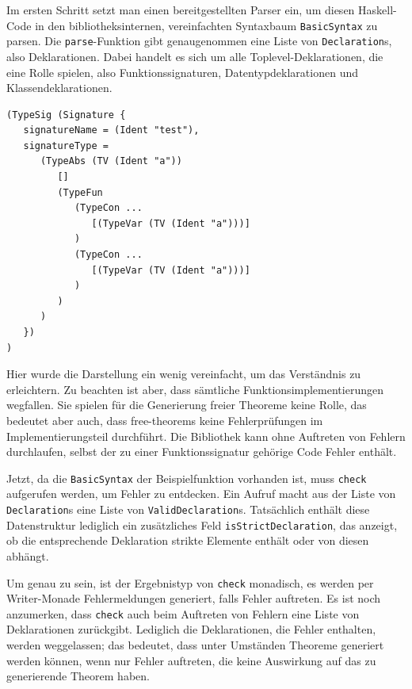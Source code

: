 Im ersten Schritt setzt man einen bereitgestellten Parser ein, um diesen Haskell-Code in den bibliotheksinternen, vereinfachten
Syntaxbaum \texttt{BasicSyntax} zu parsen. Die \texttt{parse}-Funktion gibt genaugenommen eine Liste von \texttt{Declaration}s, also Deklarationen. Dabei handelt es sich um alle Toplevel-Deklarationen, die eine Rolle spielen, also Funktionssignaturen,
Datentypdeklarationen und Klassendeklarationen.


\begin{verbatim}
(TypeSig (Signature {
   signatureName = (Ident "test"),
   signatureType =
      (TypeAbs (TV (Ident "a"))
         []
         (TypeFun
            (TypeCon ...
               [(TypeVar (TV (Ident "a")))]
            )
            (TypeCon ...
               [(TypeVar (TV (Ident "a")))]
            )
         )
      )
   })
)
\end{verbatim}

Hier wurde die Darstellung ein wenig vereinfacht, um das Verständnis zu erleichtern. Zu beachten ist aber, dass sämtliche
Funktionsimplementierungen wegfallen. Sie spielen für die Generierung freier Theoreme keine Rolle, das bedeutet aber auch,
dass free-theorems keine Fehlerprüfungen im Implementierungsteil durchführt. Die Bibliothek kann ohne Auftreten von Fehlern
durchlaufen, selbst der zu einer Funktionssignatur gehörige Code Fehler enthält.

Jetzt, da die \texttt{BasicSyntax} der Beispielfunktion vorhanden ist, muss \texttt{check} aufgerufen werden, um Fehler
zu entdecken. Ein Aufruf macht aus der Liste von \texttt{Declaration}s eine Liste von \texttt{ValidDeclaration}s. Tatsächlich
enthält diese Datenstruktur lediglich ein zusätzliches Feld \texttt{isStrictDeclaration}, das anzeigt, ob die entsprechende
Deklaration strikte Elemente enthält oder von diesen abhängt.

Um genau zu sein, ist der Ergebnistyp von \texttt{check} monadisch, es werden per Writer-Monade Fehlermeldungen
generiert, falls Fehler auftreten. Es ist noch anzumerken, dass \texttt{check} auch beim Auftreten von Fehlern eine Liste
von Deklarationen zurückgibt. Lediglich die Deklarationen, die Fehler enthalten, werden weggelassen; das bedeutet, dass
unter Umständen Theoreme generiert werden können, wenn nur Fehler auftreten, die keine Auswirkung auf das zu generierende
Theorem haben.

